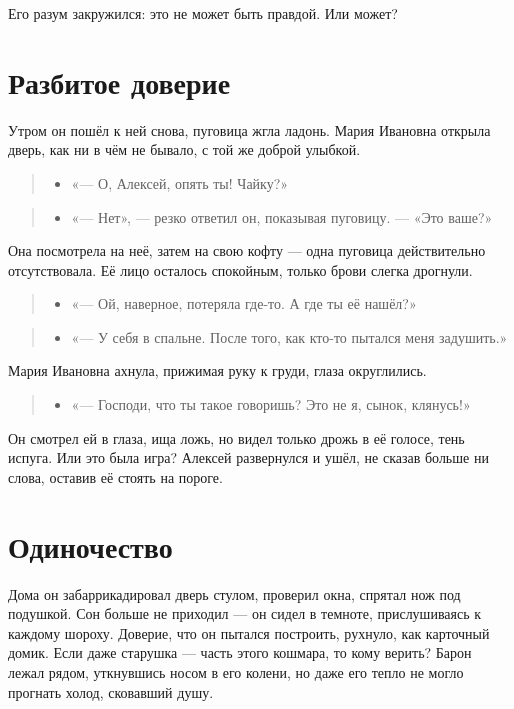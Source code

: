\documentclass[12pt,a4paper]{book}
\newenvironment{dialogue}{\begin{quote}\itshape\begin{itemize}\item[]}{\end{itemize}\end{quote}}
\begin{document}
Его разум закружился: это не может быть правдой. Или может?

\section{Разбитое доверие}

Утром он пошёл к ней снова, пуговица жгла ладонь. Мария Ивановна открыла дверь, как ни в чём не бывало, с той же доброй улыбкой.

\begin{dialogue}
«— О, Алексей, опять ты! Чайку?»
\end{dialogue}

\begin{dialogue}
«— Нет», — резко ответил он, показывая пуговицу. — «Это ваше?»
\end{dialogue}

Она посмотрела на неё, затем на свою кофту — одна пуговица действительно отсутствовала. Её лицо осталось спокойным, только брови слегка дрогнули.

\begin{dialogue}
«— Ой, наверное, потеряла где-то. А где ты её нашёл?»
\end{dialogue}

\begin{dialogue}
«— У себя в спальне. После того, как кто-то пытался меня задушить.»
\end{dialogue}

Мария Ивановна ахнула, прижимая руку к груди, глаза округлились.

\begin{dialogue}
«— Господи, что ты такое говоришь? Это не я, сынок, клянусь!»
\end{dialogue}

Он смотрел ей в глаза, ища ложь, но видел только дрожь в её голосе, тень испуга. Или это была игра? Алексей развернулся и ушёл, не сказав больше ни слова, оставив её стоять на пороге.

\section{Одиночество}

Дома он забаррикадировал дверь стулом, проверил окна, спрятал нож под подушкой. Сон больше не приходил — он сидел в темноте, прислушиваясь к каждому шороху. Доверие, что он пытался построить, рухнуло, как карточный домик. Если даже старушка — часть этого кошмара, то кому верить? Барон лежал рядом, уткнувшись носом в его колени, но даже его тепло не могло прогнать холод, сковавший душу.
\end{document}
